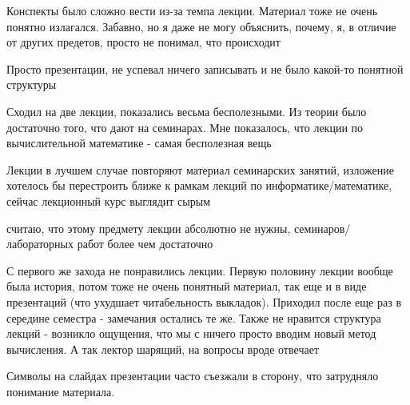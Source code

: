             \begin{commentbox} 
                Конспекты было сложно вести из-за темпа лекции. Материал тоже не очень понятно излагался. Забавно, но я даже не могу объяснить, почему, я, в отличие от других предетов, просто не понимал, что происходит 
            \end{commentbox} 
        
            \begin{commentbox} 
                Просто презентации, не успевал ничего записывать и не было какой-то понятной структуры 
            \end{commentbox} 
        
            \begin{commentbox} 
                Сходил на две лекции, показались весьма бесполезными. Из теории было достаточно того, что дают на семинарах. Мне показалось, что лекции по вычислительной математике - самая бесполезная вещь 
            \end{commentbox} 
        
            \begin{commentbox} 
                Лекции в лучшем случае повторяют материал семинарских занятий, изложение хотелось бы перестроить ближе к рамкам лекций по информатике/математике, сейчас лекционный курс выглядит сырым 
            \end{commentbox} 
        
            \begin{commentbox} 
                считаю, что этому предмету лекции абсолютно не нужны, семинаров/лабораторных работ более чем достаточно 
            \end{commentbox} 
        
            \begin{commentbox} 
                С первого же захода не понравились лекции. Первую половину лекции вообще была история, потом тоже не очень понятный материал, так еще и в виде презентаций (что ухудшает читабельность выкладок). Приходил после еще раз в середине семестра - замечания остались те же.  Также не нравится структура лекций - возникло ощущения, что мы с ничего просто вводим новый метод вычисления. А так лектор шарящий, на вопросы вроде отвечает 
            \end{commentbox} 
        
            \begin{commentbox} 
                Символы на слайдах презентации часто съезжали в сторону, что затрудняло понимание материала. 
            \end{commentbox} 
        
